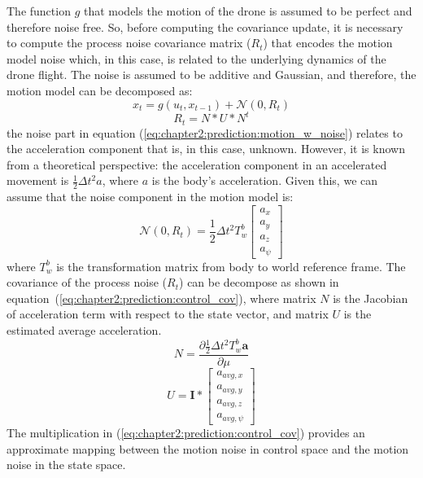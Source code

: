 The function $g$ that models the motion of the drone is assumed to be perfect and therefore noise free. So, before computing the covariance update, it is necessary to compute the process noise covariance matrix ($R_t$) that encodes the motion model noise which, in this case, is related to the underlying dynamics of the drone flight. The noise is assumed to be additive and Gaussian, and therefore, the motion model can be decomposed as:
\begin{equation}
    x_t = g(u_t, x_{t-1}) + \mathcal{N}\left(0, R_t\right)
    \label{eq:chapter2:prediction:motion_w_noise}
\end{equation}
\begin{equation}
    R_t = N * U * N^t
    \label{eq:chapter2:prediction:control_cov}
\end{equation}
the noise part in equation (\ref{eq:chapter2:prediction:motion_w_noise}) relates to the acceleration component that is, in this case, unknown. However, it is known from a theoretical perspective: the acceleration component in an accelerated movement is $\frac{1}{2}\Delta t^2 a$, where $a$ is the body's acceleration. Given this, we can assume that the noise component in the motion model is:
\begin{equation}
    \mathcal{N}\left(0, R_t\right) = \frac{1}{2} \Delta t^2 T_w^b \begin{bmatrix}
        a_x \\ a_y \\ a_z \\ a_{\psi}
    \end{bmatrix}
\end{equation}
where $T_w^b$ is the transformation matrix from body to world reference frame. The covariance of the process noise ($R_t$) can be decompose as shown in equation~(\ref{eq:chapter2:prediction:control_cov}), where matrix $N$ is the Jacobian of acceleration term  with respect to the state vector, and matrix $U$ is the estimated average acceleration.
\begin{equation}
    N = \frac{\partial \frac{1}{2} \Delta t^2 T_w^b \textbf{a}}{\partial \mu}
\end{equation}
\begin{equation}
    U = \textbf{I} * \begin{bmatrix}
        a_{avg, x} \\ a_{avg, y} \\ a_{avg, z} \\ a_{avg, \psi}
    \end{bmatrix}
\end{equation}
The multiplication in (\ref{eq:chapter2:prediction:control_cov}) provides an approximate mapping between the motion noise in control space and the motion noise in the state space.\\

